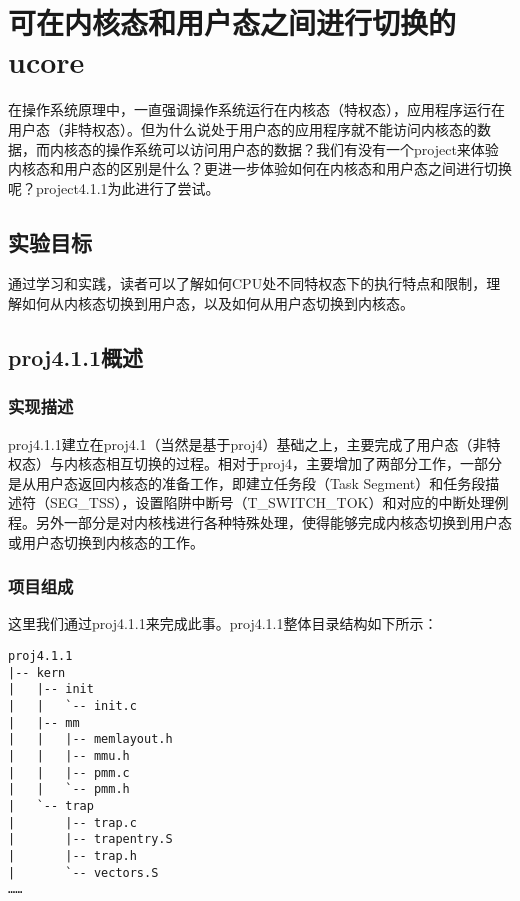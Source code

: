 \section{可在内核态和用户态之间进行切换的ucore}\label{ux53efux5728ux5185ux6838ux6001ux548cux7528ux6237ux6001ux4e4bux95f4ux8fdbux884cux5207ux6362ux7684ucore}

在操作系统原理中，一直强调操作系统运行在内核态（特权态），应用程序运行在用户态（非特权态）。但为什么说处于用户态的应用程序就不能访问内核态的数据，而内核态的操作系统可以访问用户态的数据？我们有没有一个project来体验内核态和用户态的区别是什么？更进一步体验如何在内核态和用户态之间进行切换呢？project4.1.1为此进行了尝试。

\subsection{实验目标}\label{ux5b9eux9a8cux76eeux6807}

通过学习和实践，读者可以了解如何CPU处不同特权态下的执行特点和限制，理解如何从内核态切换到用户态，以及如何从用户态切换到内核态。

\subsection{proj4.1.1概述}\label{proj4.1.1ux6982ux8ff0}

\subsubsection{实现描述}\label{ux5b9eux73b0ux63cfux8ff0}

proj4.1.1建立在proj4.1（当然是基于proj4）基础之上，主要完成了用户态（非特权态）与内核态相互切换的过程。相对于proj4，主要增加了两部分工作，一部分是从用户态返回内核态的准备工作，即建立任务段（Task
Segment）和任务段描述符（SEG\_TSS），设置陷阱中断号（T\_SWITCH\_TOK）和对应的中断处理例程。另外一部分是对内核栈进行各种特殊处理，使得能够完成内核态切换到用户态或用户态切换到内核态的工作。

\subsubsection{项目组成}\label{ux9879ux76eeux7ec4ux6210}

这里我们通过proj4.1.1来完成此事。proj4.1.1整体目录结构如下所示：

\begin{lstlisting}
proj4.1.1
|-- kern
|   |-- init
|   |   `-- init.c
|   |-- mm
|   |   |-- memlayout.h
|   |   |-- mmu.h
|   |   |-- pmm.c
|   |   `-- pmm.h
|   `-- trap
|       |-- trap.c
|       |-- trapentry.S
|       |-- trap.h
|       `-- vectors.S
……
\end{lstlisting}

